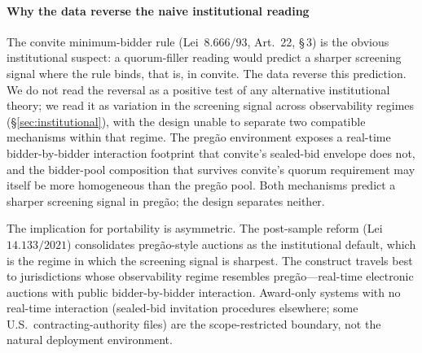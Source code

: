 \paragraph{Why the data reverse the naive institutional reading}
The convite minimum-bidder rule
(Lei~$8.666/93$, Art.\ 22, \S\,3) is the obvious institutional
suspect: a quorum-filler reading would predict a sharper
screening signal where the rule binds, that is, in convite. The
data reverse this prediction. We do not read the reversal as a
positive test of any alternative institutional theory; we read
it as variation in the screening signal across observability
regimes (\S\ref{sec:institutional}), with the design unable to
separate two compatible mechanisms within that regime. The
preg\~ao environment exposes a real-time bidder-by-bidder
interaction footprint that convite's sealed-bid envelope does
not, and the bidder-pool composition that survives convite's
quorum requirement may itself be more homogeneous than the
preg\~ao pool. Both mechanisms predict a sharper screening
signal in preg\~ao; the design separates neither.

The implication for portability is asymmetric. The
post-sample reform (Lei~$14.133/2021$) consolidates
preg\~ao-style auctions as the institutional default, which is
the regime in which the screening signal is sharpest. The
construct travels best to jurisdictions whose observability
regime resembles preg\~ao---real-time electronic auctions with
public bidder-by-bidder interaction. Award-only systems with
no real-time interaction (sealed-bid invitation procedures
elsewhere; some U.S.\ contracting-authority files) are the
scope-restricted boundary, not the natural deployment
environment.
